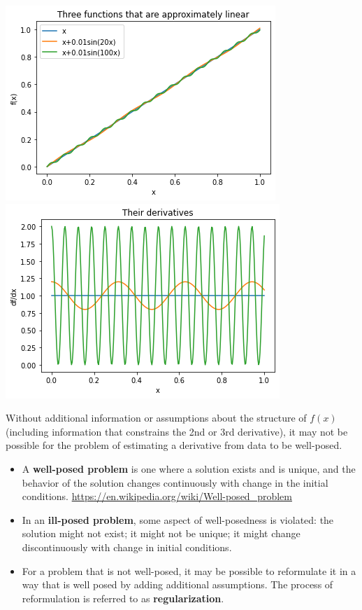 \documentclass[12pt,letterpaper,noanswers]{exam}
\begin{document}
\includegraphics[width = 0.45\linewidth]{img/Class11lines.png}
\includegraphics[width = 0.45\linewidth]{img/Class11linederiv.png}


\begin{tcolorbox}

Without additional information or assumptions about the structure of $f(x)$ (including information that constrains the 2nd or 3rd derivative), it may not be possible for the problem of estimating a derivative from data to be well-posed.

\begin{itemize}
\itemsep0pt
    \item A \textbf{well-posed problem} is one where a solution exists and is unique, and the behavior of the solution changes continuously with change in the initial conditions.  \url{https://en.wikipedia.org/wiki/Well-posed_problem}
    \item In an \textbf{ill-posed problem}, some aspect of well-posedness is violated: the solution might not exist; it might not be unique; it might change discontinuously with change in initial conditions.
    \item For a problem that is not well-posed, it may be possible to reformulate it in a way that is well posed by adding additional assumptions.  The process of reformulation is referred to as \textbf{regularization}.
\end{itemize}
\end{tcolorbox}
\end{document}
